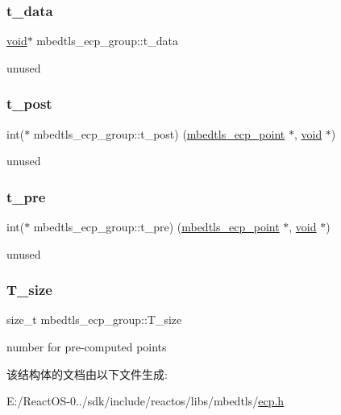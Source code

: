\subsubsection{\texorpdfstring{t\+\_\+data}{t\_data}}
{\footnotesize\ttfamily \hyperlink{interfacevoid}{void}$\ast$ mbedtls\+\_\+ecp\+\_\+group\+::t\+\_\+data}

unused \mbox{\label{structmbedtls__ecp__group_aa67390761ba1d1f8b724d1550e451908}} 
\subsubsection{\texorpdfstring{t\+\_\+post}{t\_post}}
{\footnotesize\ttfamily int($\ast$ mbedtls\+\_\+ecp\+\_\+group\+::t\+\_\+post) (\hyperlink{structmbedtls__ecp__point}{mbedtls\+\_\+ecp\+\_\+point} $\ast$, \hyperlink{interfacevoid}{void} $\ast$)}

unused \mbox{\label{structmbedtls__ecp__group_a2a4fbe0909b4feb994eaac95e1281cc6}} 
\subsubsection{\texorpdfstring{t\+\_\+pre}{t\_pre}}
{\footnotesize\ttfamily int($\ast$ mbedtls\+\_\+ecp\+\_\+group\+::t\+\_\+pre) (\hyperlink{structmbedtls__ecp__point}{mbedtls\+\_\+ecp\+\_\+point} $\ast$, \hyperlink{interfacevoid}{void} $\ast$)}

unused \mbox{\label{structmbedtls__ecp__group_a4b9a1bf79d2023dbc3807dc7e12059af}} 
\subsubsection{\texorpdfstring{T\+\_\+size}{T\_size}}
{\footnotesize\ttfamily size\+\_\+t mbedtls\+\_\+ecp\+\_\+group\+::\+T\+\_\+size}

number for pre-\/computed points 

该结构体的文档由以下文件生成\+:\begin{DoxyCompactItemize}
\item 
E\+:/\+React\+O\+S-\/0../sdk/include/reactos/libs/mbedtls/\hyperlink{ecp_8h}{ecp.\+h}\end{DoxyCompactItemize}
